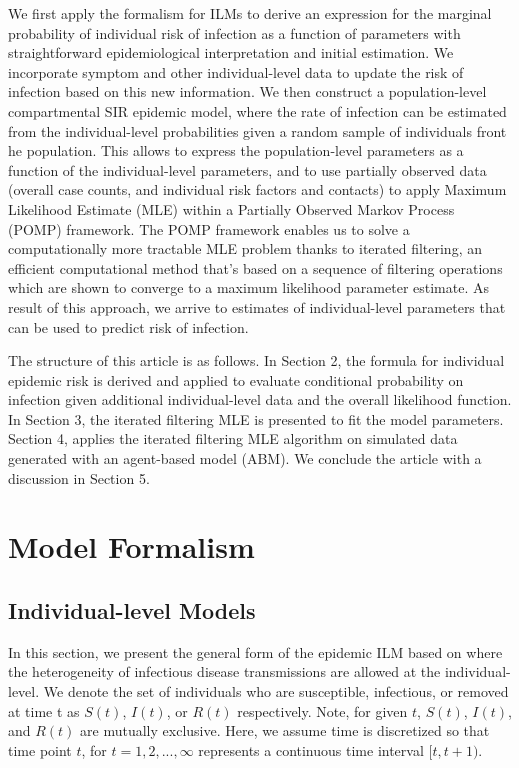 \documentclass{article}
\begin{document}
We first apply the formalism for ILMs to derive an expression for the marginal probability of individual risk of infection as a function of parameters with straightforward epidemiological interpretation and initial estimation. We incorporate symptom and other individual-level data to update the risk of infection based on this new information. We then construct a population-level compartmental SIR epidemic model, where the rate of infection can be estimated from the individual-level probabilities given a random sample of individuals front he population. This allows to express the population-level parameters as a function of the individual-level parameters, and to use partially observed data (overall case counts, and individual risk factors and contacts) to apply Maximum Likelihood Estimate (MLE) within a Partially Observed Markov Process (POMP) framework. The POMP framework enables us to solve a computationally more tractable MLE problem thanks to iterated filtering, an efficient computational method that's based on a sequence of filtering operations which are shown to converge to a maximum likelihood parameter estimate. As result of this approach, we arrive to estimates of individual-level parameters that can be used to predict risk of infection.

The structure of this article is as follows. In Section 2, the formula for individual epidemic risk is derived and applied to evaluate conditional probability on infection given additional individual-level data and the overall likelihood function. In Section 3, the iterated filtering MLE is presented to fit the model parameters. Section 4, applies the iterated filtering MLE algorithm on simulated data generated with an agent-based model (ABM). We conclude the article with a discussion in Section 5.

\section{Model Formalism}

\subsection{Individual-level Models}

In this section, we present the general form of the epidemic ILM based on \cite{Deardon2010} where the heterogeneity of infectious disease transmissions are allowed at the individual-level. We denote the set of individuals who are susceptible, infectious, or removed at time t as $S(t)$, $I(t)$, or $R(t)$ respectively. Note, for given $t$, $S(t)$, $I(t)$, and $R(t)$ are mutually exclusive. Here, we assume time is discretized so that time point $t$, for $t=1, 2, ..., \infty$ represents a continuous time interval $[t, t + 1)$.
\end{document}
